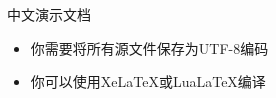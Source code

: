 \documentclass{ctexbeamer}  %
\begin{document}
	\begin{frame}{中文演示文档}
		\begin{itemize}
			\item 你需要将所有源文件保存为UTF-8编码
			\item 你可以使用XeLaTeX或LuaLaTeX编译
		\end{itemize}
	\end{frame}
\end{document}
